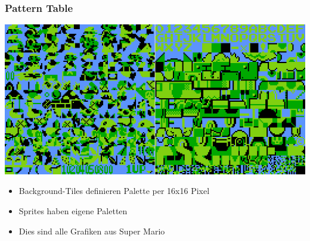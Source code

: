 \documentclass{beamer}
\begin{document}
    \begin{frame}
        \frametitle{Pattern Table}
         \includegraphics[height=0.5\linewidth]{img/pattern.png}   
        \begin{itemize}
                \item{Background-Tiles definieren Palette per 16x16 Pixel}
                \item{Sprites haben eigene Paletten}
                \item{Dies sind alle Grafiken aus Super Mario}
        \end{itemize}
    \end{frame}
    
\end{document}
